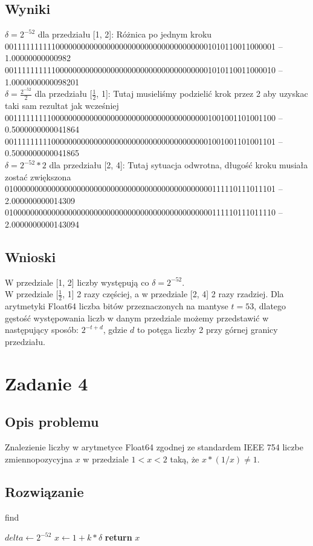 \documentclass{article}
\begin{document}
\subsection{Wyniki}
	$\delta=2^{-52}$ dla przedziału [1, 2]: 
	Różnica po jednym kroku\\
	0011111111110000000000000000000000000000000000001010110011000001 -- 1.00000000000982\\
	0011111111110000000000000000000000000000000000001010110011000010 -- 1.0000000000098201\\
	$\delta=\frac{2^{-52}}{2}$ dla przedziału [$\frac{1}{2}$, 1]:
	Tutaj musieliśmy podzielić krok przez 2 aby uzyskac taki sam rezultat jak wcześniej\\
	0011111111100000000000000000000000000000000000001001001101001100 -- 0.5000000000041864\\
	0011111111100000000000000000000000000000000000001001001101001101 -- 0.5000000000041865\\
	$\delta=2^{-52} * 2$ dla przedziału [2, 4]:
	Tutaj sytuacja odwrotna, długość kroku musiała zostać zwiększona\\
	0100000000000000000000000000000000000000000000000111110111011101 -- 2.000000000014309\\
	0100000000000000000000000000000000000000000000000111110111011110 -- 2.0000000000143094\\
\subsection{Wnioski}
	W przedziale [1, 2] liczby występują co $\delta=2^{-52}$.\\
	W przedziale [$\frac{1}{2}$, 1] 2 razy częściej, a w przedziale [2, 4] 2 razy rzadziej.
    Dla arytmetyki Float64 liczba bitów przeznaczonych na mantyse $t = 53$, dlatego gęstość występowania liczb w danym przedziale możemy przedstawić w następujący sposób:
    $2^{-t + d}$, gdzie $d$ to potęga liczby 2 przy górnej granicy przedziału.

\section{Zadanie 4}
\subsection{Opis problemu}
    Znalezienie liczby w arytmetyce Float64 zgodnej ze standardem IEEE 754 liczbe zmiennopozycyjna $x$ w przedziale $1<x<2$ taką, że $x*(1/x) \neq 1$.
\subsection{Rozwiązanie}
    \begin{algorithm}
    \caption{find}\label{alg:cap}
    \begin{algorithmic}
        \State $delta \gets 2^{-52}$
        	\State $x \gets 1 + k * \delta$
                \State \textbf{return} $x$
            \EndIf
        \EndFor
    \end{algorithmic}
    \end{algorithm}
\end{document}
